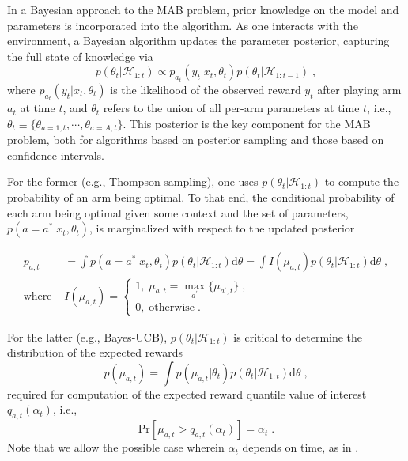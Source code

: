 \documentclass{article}
\newcommand{\HH}{\mathcal{H}}
\newcommand{\ie}{i.e., }
\newcommand{\eg}{e.g., }
\begin{document}
In a Bayesian approach to the MAB problem, prior knowledge on the model and parameters is incorporated into the algorithm. As one interacts with the environment, a Bayesian algorithm updates the parameter posterior, capturing the full state of knowledge via 
\begin{equation}
p(\theta_t|\HH_{1:t}) \propto p_{a_t}(y_t | x_t, \theta_t)p(\theta_t | \HH_{1:t-1}) \; ,
\label{eq:param_posterior}
\end{equation}
where $p_{a_t}(y_t | x_t, \theta_t)$ is the likelihood of the observed reward $y_t$ after playing arm $a_t$ at time $t$, and $\theta_t$ refers to the union of all per-arm parameters at time $t$, \ie $\theta_t \equiv \{\theta_{a=1,t}, \cdots, \theta_{a=A,t}\}$. This posterior is the key component for the MAB problem, both for algorithms based on posterior sampling and those based on confidence intervals.

For the former (\eg Thompson sampling), one uses $p(\theta_t|\HH_{1:t})$ to compute the probability of an arm being optimal. To that end, the conditional probability of each arm being optimal given some context and the set of parameters, $p(a=a^*|x_t, \theta_t)$, is marginalized with respect to the updated posterior

\begin{equation}
\begin{split}
p_{a,t} &=\int p(a=a^*|x_t, \theta_t) p(\theta_t|\HH_{1:t}) \mathrm{d}\theta = \int I(\mu_{a,t}) p(\theta_t|\HH_{1:t}) \mathrm{d}\theta \;, \\
\text{where }&I(\mu_{a,t}) = \begin{cases}
1, \; \mu_{a,t}=\max_{a^\prime}\{\mu_{a^\prime,t}\} \;, \\
0, \; \text{otherwise} \;.
\end{cases}
\label{eq:pr_arm_optimal}
\end{split}
\end{equation}

For the latter (\eg Bayes-UCB), $p(\theta_t|\HH_{1:t})$ is critical to determine the distribution of the expected rewards
\begin{equation}
p(\mu_{a,t}) = \int p(\mu_{a,t}|\theta_{t}) p(\theta_t|\HH_{1:t}) \mathrm{d}\theta \;,
\label{eq:density_expected_rewards}
\end{equation}
required for computation of the expected reward quantile value of interest $q_{a,t}(\alpha_{t})$, \ie
\begin{equation}
\mathrm{Pr}\left[\mu_{a,t}>q_{a,t}(\alpha_{t})\right]=\alpha_{t} \; .
\label{eq:quantile_expected_rewards}
\end{equation}
Note that we allow the possible case wherein $\alpha_t$ depends on time, as in \cite{ip-Kaufmann2012}.
\end{document}
